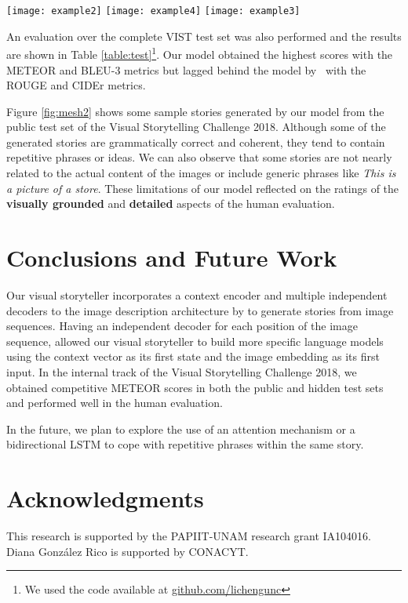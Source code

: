 \documentclass[11pt,a4paper]{article}
\begin{document}
\begin{figure*}[hb!]
    \centering
    \texttt{[image: example2]}
    \texttt{[image: example4]}
    \texttt{[image: example3]}
    \caption{Sample stories generated by our visual storyteller, compared to generated by humans.}
    \label{fig:mesh2}
\end{figure*}
An evaluation over the complete VIST test set was also performed and the results are shown in Table \ref{table:test}\footnote{\footnotesize We used the code available at \href{https://github.com/lichengunc/vist_eval}{github.com/lichengunc}}. 
\newpage
Our model obtained the highest scores with the METEOR and BLEU-3 metrics but lagged behind the model by~\cite{licheng} with the ROUGE and CIDEr metrics. 


Figure \ref{fig:mesh2} shows some sample stories generated by our model from the public test set of the Visual Storytelling Challenge 2018. Although some of the generated stories are grammatically correct and coherent, they tend to contain repetitive phrases or ideas. We can also observe that some stories are not nearly related to the actual content of the images or include generic phrases like \textit{This is a picture of a store}. These limitations of our model reflected on the ratings of the \textbf{visually grounded} and \textbf{detailed} aspects of the human evaluation.

\section{Conclusions and Future Work}
Our visual storyteller incorporates a context encoder and multiple independent decoders to the image description architecture by \cite{vinyals} to generate stories from image sequences. Having an independent decoder for each position of the image sequence, allowed our visual storyteller to build more specific language models using the context vector as its first state and the image embedding as its first input. In the internal track of the Visual Storytelling Challenge 2018, we obtained competitive METEOR scores in both the public and hidden test sets and performed well in the human evaluation. 

In the future, we plan to explore the use of an attention mechanism or a bidirectional LSTM to cope with repetitive phrases within the same story.

\section{Acknowledgments}
This research is supported by the PAPIIT-UNAM research grant IA104016. 
Diana Gonz\'alez Rico is supported by CONACYT.  



\end{document}
